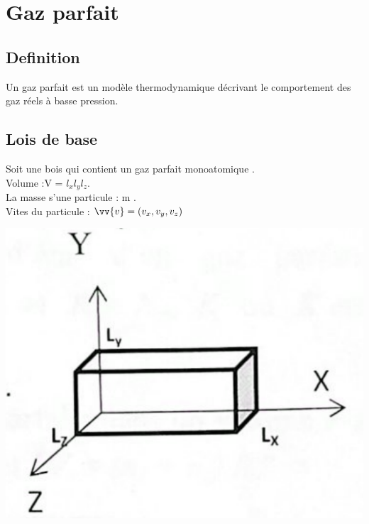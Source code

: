 \documentclass[12pt,oneside]{book}
\begin{document}
\chapter{Gaz parfait}
\section{Definition}
Un gaz parfait est un modèle thermodynamique décrivant le comportement des gaz réels à basse pression.
\section{Lois de base}
\begin{minipage}{0.7\linewidth}
    Soit une bois qui contient un gaz parfait monoatomique .\\
    Volume :V = $l_xl_yl_z$.\\
    La masse s'une particule : m . \\
    Vites du particule : $\vv{v} = (v_x,v_y,v_z)$
\end{minipage}
\begin{minipage}{0.3\linewidth}
    \includegraphics[width=\linewidth]{../pic/3300/2.png}
\end{minipage}
\end{document}
